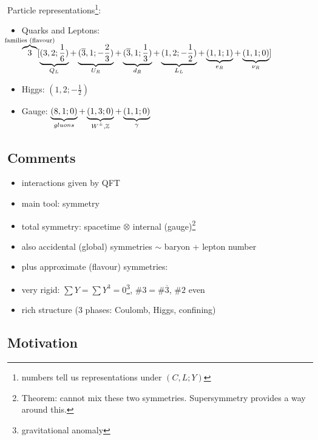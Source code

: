 Particle representations\footnote{numbers tell us representations under $(C, L; Y)$}:
\begin{itemize}
  \item Quarks and Leptons: $\overbrace{3}^{\mathclap{\text{families (flavour)}}}[\underbrace{(3, 2; \frac{1}{6})}_{\mathclap{Q_L}} + \underbrace{(\overline{3}, 1; -\frac{2}{3})}_{\mathclap{U_R}} + \underbrace{(\overline{3}, 1; \frac{1}{3})}_{\mathclap{d_R}} + \underbrace{(1, 2; -\frac{1}{2})}_{\mathclap{L_L}} 
    + \underbrace{(1, 1; 1)}_{\mathclap{e_R}} + \underbrace{(1, 1; 0)}_{\mathclap{\nu_R}}]$ 
  \item Higgs: $(1, 2; -\frac{1}{2})$ 
  \item Gauge: $\underbrace{(8, 1; 0)}_{\mathclap{gluons}} + \underbrace{(1, 3; 0)}_{\mathclap{W^{\pm}, \mathbb{Z}}} + \underbrace{(1, 1; 0)}_{\mathclap{\gamma}}$ 
\end{itemize}

\subsection*{Comments}%

\begin{itemize}
  \item interactions given by QFT
  \item main tool: symmetry
  \item total symmetry: spacetime $\otimes$ internal (gauge)\footnote{Theorem: cannot mix these two symmetries. Supersymmetry provides a way around this.}
  \item also accidental (global) symmetries $\sim$ baryon + lepton number
  \item plus approximate (flavour) symmetries:
  \item very rigid: $\sum Y = \sum Y^3 = 0$\footnote{gravitational anomaly}, $\#3 = \# \overline{3}$, $\# 2$ even
  \item rich structure (3 phases: Coulomb, Higgs, confining)
\end{itemize}

\subsection*{Motivation}%

